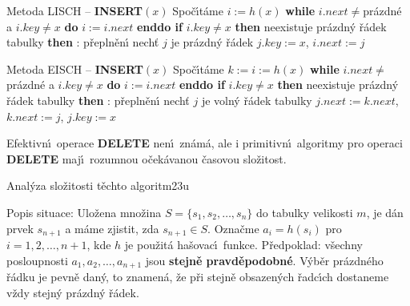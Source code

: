 \documentclass[a4paper,12pt]{article}
\begin{document}
\flushpar Metoda LISCH -- {\bf INSERT$(x)$}\newline 
Spo\v c\'\i t\'ame $i:=h(x)$\newline 
{\bf while} $i.next\ne$pr\'azdn\'e a $i.key\ne x$ {\bf do} $i:=i.
next$ {\bf enddo \newline 
if} $i.key\ne x$ {\bf then}\newline 
\phantom{---}{\bf if} neexistuje pr\'azdn\'y \v r\'adek tabulky {\bf then}\newline 
\phantom{------}{\bf V\'ystup}: p\v repln\v en\'\i\newline 
\phantom{---}{\bf else}\newline 
\phantom{------}nech\v t $j$ je pr\'azdn\'y \v r\'adek $j.
key:=x$, 
$i.next:=j$\newline 
\phantom{---}{\bf endif\newline 
endif}
\bigskip

\flushpar Metoda EISCH -- {\bf INSERT$(x)$}\newline 
Spo\v c\'\i t\'ame $k:=i:=h(x)$\newline 
{\bf while} $i.next\ne$pr\'azdn\'e a $i.key\ne x$ {\bf do} $i:=i.
next$ {\bf enddo \newline 
if} $i.key\ne x$ {\bf then}\newline 
\phantom{---}{\bf if} neexistuje pr\'azdn\'y \v r\'adek tabulky {\bf then}\newline 
\phantom{------}{\bf V\'ystup}: p\v repln\v en\'\i\newline 
\phantom{---}{\bf else}\newline 
\phantom{------}nech\v t $j$ je voln\'y \v r\'adek tabulky\newline 
\phantom{------}$j.next:=k.next$, $k.next:=j$, $j.key:=x$\newline 
\phantom{---}{\bf endif\newline 
endif}
\bigskip

\flushpar Efektivn\'\i\ operace {\bf DELETE}  nen\'\i\ zn\'am\'a, ale i primitivn\'\i\ 
algoritmy pro operaci {\bf DELETE} maj\'\i\ rozumnou o\v cek\'avanou 
\v casovou slo\v zitost.
\medskip

\subhead
Anal\'yza slo\v zitosti t\v echto algoritm\accent23u
\endsubhead
\smallskip

\flushpar Popis situace: Ulo\v zena mno\v zina 
$S=\{s_1,s_2,\dots,s_n\}$ do ta\-bulky velikosti $m$, je d\'an 
prvek $s_{n+1}$ a m\'ame zjistit, zda $s_{n+1}\in S$. Ozna\v cme 
$a_i=h(s_i)$ pro $i=1,2,\dots,n+1$, kde $h$ je pou\v zit\'a ha\v sovac\'\i\ 
funkce.\newline 
P\v redpoklad: v\v sechny posloupnosti $a_1,a_2,\dots,a_{n+1}$ jsou 
{\bf stejn\v e pravd\v epodobn\'e}. V\'yb\v er pr\'azdn\'eho \v r\'adku je 
pevn\v e dan\'y, to znamen\'a, \v ze p\v ri stejn\v e obsazen\'ych 
\v radc\'\i ch dostaneme v\v zdy stejn\'y pr\'azdn\'y \v r\'adek.  
\medskip
\end{document}
